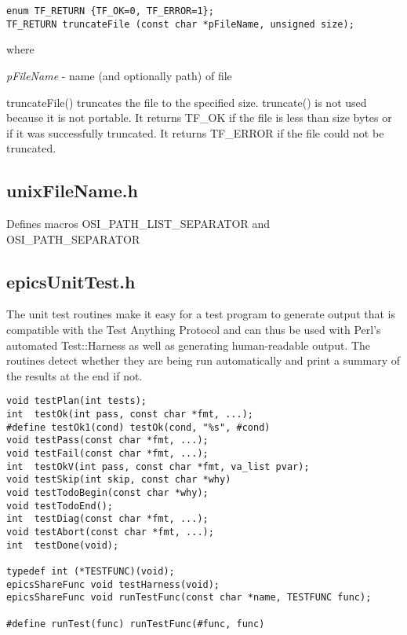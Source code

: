 \begin{verbatim}
enum TF_RETURN {TF_OK=0, TF_ERROR=1};
TF_RETURN truncateFile (const char *pFileName, unsigned size);
\end{verbatim}

where

\begin{description}
\item \emph{pFileName} - name (and optionally path) of file

\end{description}

truncateFile() truncates the file to the specified size.
truncate() is not used because it is not portable.
It returns TF\_OK if the file is less than size bytes or if it was successfully truncated.
It returns TF\_ERROR if the file could not be truncated.

\subsection{unixFileName.h}

Defines macros OSI\_PATH\_LIST\_SEPARATOR and OSI\_PATH\_SEPARATOR

\subsection{epicsUnitTest.h}

The unit test routines make it easy for a test program to generate output that is compatible with the Test Anything Protocol and can thus be used with Perl's automated Test::Harness as well as generating human-readable output.
The routines detect whether they are being run automatically and print a summary of the results at the end if not.

\begin{verbatim}
void testPlan(int tests);
int  testOk(int pass, const char *fmt, ...);
#define testOk1(cond) testOk(cond, "%s", #cond)
void testPass(const char *fmt, ...);
void testFail(const char *fmt, ...);
int  testOkV(int pass, const char *fmt, va_list pvar);
void testSkip(int skip, const char *why)
void testTodoBegin(const char *why);
void testTodoEnd();
int  testDiag(const char *fmt, ...);
void testAbort(const char *fmt, ...);
int  testDone(void);

typedef int (*TESTFUNC)(void);
epicsShareFunc void testHarness(void);
epicsShareFunc void runTestFunc(const char *name, TESTFUNC func);

#define runTest(func) runTestFunc(#func, func)
\end{verbatim}


